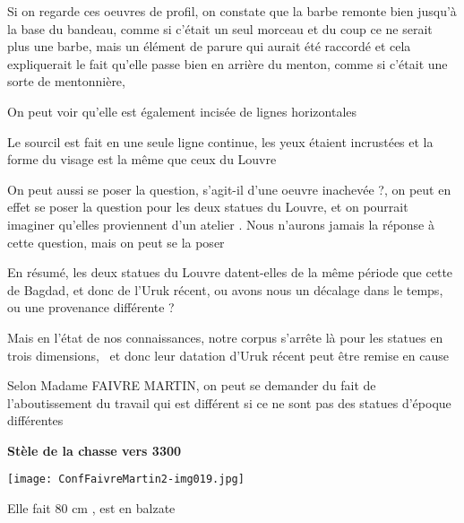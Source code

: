 \documentclass[a4paper]{article}
\begin{document}
\bigskip

{
Si on regarde ces oeuvres de profil, on constate que la barbe remonte bien jusqu'à la base du bandeau, comme si c'était
un seul morceau et du coup ce ne serait plus une barbe, mais un élément de parure qui aurait été raccordé et cela
expliquerait le fait qu'elle passe bien en arrière du menton, comme si c'était une sorte de mentonnière,}

{
On peut voir qu'elle est également incisée de lignes horizontales}

{
Le sourcil est fait en une seule ligne continue, les yeux étaient incrustées et la forme du visage est la même que ceux
du Louvre}


\bigskip

{
On peut aussi se poser la question, s'agit-il d'une oeuvre inachevée ?, on peut en effet se poser la question pour les
deux statues du Louvre, et on pourrait imaginer qu'elles proviennent d'un atelier . Nous n'aurons jamais la réponse à
cette question, mais on peut se la poser}


\bigskip

{
En résumé, les deux statues du Louvre datent-elles de la même période que cette de Bagdad, et donc de l'Uruk récent, ou
avons nous un décalage dans le temps, ou une provenance différente ?}

{
Mais en l'état de nos connaissances, notre corpus s'arrête là pour les statues en trois dimensions, \ et donc leur
datation d'Uruk récent peut être remise en cause }

{
Selon Madame FAIVRE MARTIN, on peut se demander du fait de l'aboutissement du travail qui est différent si ce ne sont
pas des statues d'époque différentes}


\bigskip


\bigskip

{
\textbf{Stèle de la chasse vers 3300}}


\bigskip


\bigskip


\bigskip

 \texttt{[image: ConfFaivreMartin2-img019.jpg]} 


\bigskip


\bigskip


\bigskip

{
Elle fait 80 cm , est en balzate}
\end{document}
